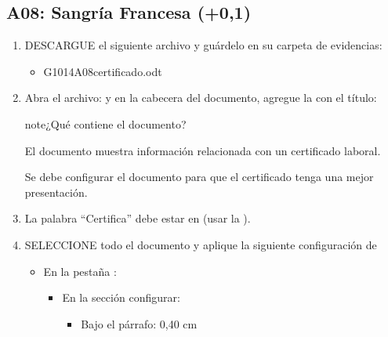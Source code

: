 \documentclass[letterpaper,10pt,spanish]{sphinxmanual}
\begin{document}
\subsection{A08: Sangría Francesa  (+0,1)}
\label{\detokenize{1_guias/10ofimatica/G1014:a08-sangria-francesa-101-0-1}}
\sphinxAtStartPar
{}
\begin{enumerate}
%
\item {} 
\sphinxAtStartPar
DESCARGUE el siguiente archivo y guárdelo en su carpeta de evidencias:
\begin{itemize}
\item {} 
\sphinxAtStartPar
G1014A08\sphinxhyphen{}certificado.odt 

\end{itemize}

\item {} 
\sphinxAtStartPar
Abra el archivo:  y en la cabecera del documento, agregue la  con el título: 

\begin{sphinxadmonition}{note}{¿Qué contiene el documento?}

\sphinxAtStartPar
El documento muestra información relacionada con un certificado laboral.

\sphinxAtStartPar
Se debe configurar el documento para que el certificado tenga una mejor presentación.
\end{sphinxadmonition}

\item {} 
\sphinxAtStartPar
La palabra “Certifica” debe estar en  (usar la ).

\item {} 
\sphinxAtStartPar
SELECCIONE todo el documento y aplique la siguiente configuración de 
\begin{itemize}
\item {} 
\sphinxAtStartPar
En la pestaña :
\begin{itemize}
\item {} 
\sphinxAtStartPar
En la sección  configurar:
\begin{itemize}
\item {} 
\sphinxAtStartPar
Bajo el párrafo: 0,40 cm


\end{itemize}
\end{itemize}
\end{itemize}
\end{enumerate}
\end{document}
